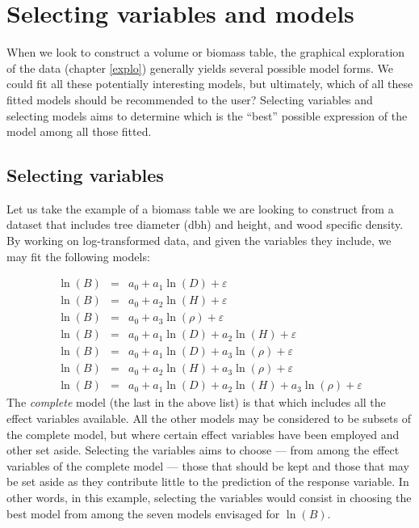 \section{Selecting variables and models\label{select}}

When we look to construct a volume or biomass table, the graphical exploration of the data (chapter \ref{explo}) generally yields several possible model forms. We could fit all these potentially interesting models, but ultimately, which of all these fitted models should be recommended to the user? Selecting variables and selecting models aims to determine which is the ``best'' possible expression of the model among all those fitted.

\subsection{Selecting variables}

Let us take the example of a biomass table we are looking to construct from a dataset that includes tree diameter (dbh) and height, and wood specific density. By working on log-transformed data, and given the variables they include, we may fit the following models:

\begin{eqnarray*}
\ln(B) &=& a_0+a_1\ln(D)+\varepsilon\\ %
\ln(B) &=& a_0+a_2\ln(H)+\varepsilon\\ %
\ln(B) &=& a_0+a_3\ln(\rho)+\varepsilon\\ %
\ln(B) &=& a_0+a_1\ln(D)+a_2\ln(H)+\varepsilon\\ %
\ln(B) &=& a_0+a_1\ln(D)+a_3\ln(\rho)+\varepsilon\\ %
\ln(B) &=& a_0+a_2\ln(H)+a_3\ln(\rho)+\varepsilon\\ %
\ln(B) &=& a_0+a_1\ln(D)+a_2\ln(H)+a_3\ln(\rho)+\varepsilon
\end{eqnarray*}
The \emph{complete} model (the last in the above list) is that which includes all the effect variables available. All the other models may be considered to be subsets of the complete model, but where certain effect variables have been employed and other set aside. Selecting the variables aims to choose --- from among the effect variables of the complete model --- those that should be kept and those that may be set aside as they contribute little to the prediction of the response variable. In other words, in this example, selecting the variables would consist in choosing the best model from among the seven models envisaged for $\ln(B)$.

